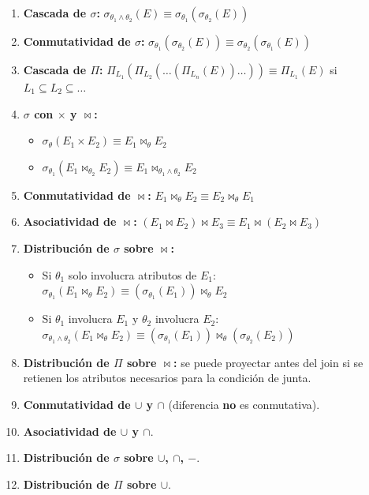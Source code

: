 \documentclass[11pt, a4paper]{article}
\begin{document}
\begin{enumerate}[nosep]
	\item \textbf{Cascada de $\sigma$:} $\sigma_{\theta_1 \wedge \theta_2}(E) \equiv \sigma_{\theta_1}(\sigma_{\theta_2}(E))$
	\item \textbf{Conmutatividad de $\sigma$:} $\sigma_{\theta_1}(\sigma_{\theta_2}(E)) \equiv \sigma_{\theta_2}(\sigma_{\theta_1}(E))$
	\item \textbf{Cascada de $\Pi$:} $\Pi_{L_1}(\Pi_{L_2}(\ldots(\Pi_{L_n}(E))\ldots)) \equiv \Pi_{L_1}(E)$ si $L_1 \subseteq L_2 \subseteq \ldots$
	\item \textbf{$\sigma$ con $\times$ y $\bowtie$:}
	      \begin{itemize}[nosep]
		      \item $\sigma_\theta(E_1 \times E_2) \equiv E_1 \bowtie_\theta E_2$
		      \item $\sigma_{\theta_1}(E_1 \bowtie_{\theta_2} E_2) \equiv E_1 \bowtie_{\theta_1 \wedge \theta_2} E_2$
	      \end{itemize}
	\item \textbf{Conmutatividad de $\bowtie$:} $E_1 \bowtie_\theta E_2 \equiv E_2 \bowtie_\theta E_1$
	\item \textbf{Asociatividad de $\bowtie$:} $(E_1 \bowtie E_2) \bowtie E_3 \equiv E_1 \bowtie (E_2 \bowtie E_3)$
	\item \textbf{Distribución de $\sigma$ sobre $\bowtie$:}
	      \begin{itemize}[nosep]
		      \item Si $\theta_1$ solo involucra atributos de $E_1$: $\sigma_{\theta_1}(E_1 \bowtie_\theta E_2) \equiv (\sigma_{\theta_1}(E_1)) \bowtie_\theta E_2$
		      \item Si $\theta_1$ involucra $E_1$ y $\theta_2$ involucra $E_2$: $\sigma_{\theta_1 \wedge \theta_2}(E_1 \bowtie_\theta E_2) \equiv (\sigma_{\theta_1}(E_1)) \bowtie_\theta (\sigma_{\theta_2}(E_2))$
	      \end{itemize}
	\item \textbf{Distribución de $\Pi$ sobre $\bowtie$:} se puede proyectar antes del join si se retienen los atributos necesarios para la condición de junta.
	\item \textbf{Conmutatividad de $\cup$ y $\cap$} (diferencia \textbf{no} es conmutativa).
	\item \textbf{Asociatividad de $\cup$ y $\cap$}.
	\item \textbf{Distribución de $\sigma$ sobre $\cup$, $\cap$, $-$}.
	\item \textbf{Distribución de $\Pi$ sobre $\cup$}.
\end{enumerate}
\end{document}
